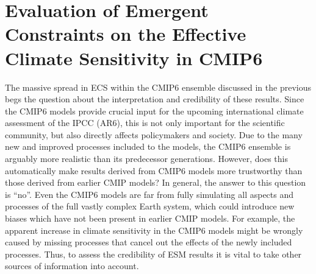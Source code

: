 


\chapter{Evaluation of Emergent Constraints on the Effective Climate
  Sensitivity in \acs{CMIP}6}
\label{ch:05:paper_ecs}

The massive spread in \ac{ECS} within the \acs{CMIP}6 ensemble discussed in the
previous  begs the question about the
interpretation and credibility of these results. Since the \acs{CMIP}6 models
provide crucial input for the upcoming international climate assessment of the
\ac{IPCC} (\acs{AR}6), this is not only important for the scientific community,
but also directly affects policymakers and society. Due to the many new and
improved processes included to the models, the \acs{CMIP}6 ensemble is arguably
more realistic than its predecessor generations. However, does this
automatically make results derived from \acs{CMIP}6 models more trustworthy
than those derived from earlier \ac{CMIP} models? In general, the answer to
this question is \enquote{no}. Even the \acs{CMIP}6 models are far from fully
simulating all aspects and processes of the full vastly complex Earth system,
which could introduce new biases which have not been present in earlier
\ac{CMIP} models. For example, the apparent increase in climate sensitivity in
the \acs{CMIP}6 models might be wrongly caused by missing processes that cancel
out the effects of the newly included processes. Thus, to assess the
credibility of \ac{ESM} results it is vital to take other sources of
information into account.

